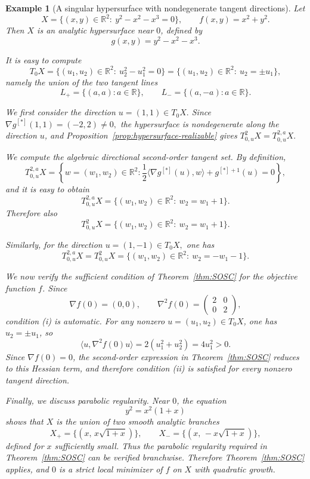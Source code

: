 \documentclass[10pt,reqno]{amsart}
\theoremstyle{break-italic}
\theoremstyle{break-italic}
\theoremstyle{break-italic}
\theoremstyle{break-italic}
\theoremstyle{break-italic}
\theoremstyle{break-italic}
\theoremstyle{break-italic}
\theoremstyle{break-italic}
\theoremstyle{break-roman}
\newtheorem{example}[satz]{Example}
\theoremstyle{standard}
\theoremstyle{varthm-roman}
\theoremstyle{varthm-italic}
\theoremstyle{varthm-roman-break}
\theoremstyle{varthm-italic-break}
\theoremstyle{varthm-roman-no-punctuation}
\theoremstyle{varthm-italic-no-punctuation}
\numberwithin{equation}{section}
\begin{document}
\begin{example}[A singular hypersurface with nondegenerate tangent directions]
\label{ex:opt-hypersurface}
Let
\[
X=\{(x,y)\in\mathbb R^2:\ y^2-x^2-x^3=0\},
\qquad
f(x,y)=x^2+y^2.
\]
Then $X$ is an analytic hypersurface near $0$, defined by
\[
g(x,y)=y^2-x^2-x^3.
\]

It is easy to compute 
\[
T_0X=\{(u_1,u_2)\in\mathbb R^2:\ u_2^2-u_1^2=0\}
=\{(u_1,u_2)\in\mathbb R^2:\ u_2=\pm u_1\},
\]
namely the union of the two tangent lines
\[
L_+=\{(a,a):a\in\mathbb R\},
\qquad
L_-=\{(a,-a):a\in\mathbb R\}.
\]

We first consider the direction
\(
u=(1,1)\in T_0X.
\)
Since 
\(
\nabla g^{[\ast]}(1,1)=(-2,2)\neq 0,
\)
the hypersurface is nondegenerate along the direction $u$, and
Proposition~\ref{prop:hypersurface-realizable} gives
\(
T^2_{0,u}X=T^{2,a}_{0,u}X.
\)

We compute the algebraic directional second-order tangent set. By definition,
\[
T^{2,a}_{0,u}X
=
\left\{
w=(w_1,w_2)\in\mathbb R^2:
\frac12\langle \nabla g^{[\ast]}(u),w\rangle + g^{[\ast]+1}(u)=0
\right\},
\]
and it is easy to obtain
\[
T^{2,a}_{0,u}X
=
\{(w_1,w_2)\in\mathbb R^2:\ w_2=w_1+1\}.
\]
Therefore also
\[
T^2_{0,u}X
=
\{(w_1,w_2)\in\mathbb R^2:\ w_2=w_1+1\}.
\]

Similarly, for the direction
\(
u=(1,-1)\in T_0X,
\)
one has
\[
T^{2,a}_{0,u}X=T^2_{0,u}X
=
\{(w_1,w_2)\in\mathbb R^2:\ w_2=-w_1-1\}.
\]

We now verify the sufficient condition of Theorem~\ref{thm:SOSC} for the
objective function $f$. Since
\[
\nabla f(0)=(0,0),
\qquad
\nabla^2 f(0)=
\begin{pmatrix}
2&0\\
0&2
\end{pmatrix},
\]
condition {\rm(i)} is automatic. For any nonzero
$u=(u_1,u_2)\in T_0X$, one has $u_2=\pm u_1$, so
\[
\langle u,\nabla^2 f(0)u\rangle
=
2(u_1^2+u_2^2)
=
4u_1^2>0.
\]
Since $\nabla f(0)=0$, the second-order expression in
Theorem~\ref{thm:SOSC} reduces to this Hessian term, and therefore
condition {\rm(ii)} is satisfied for every nonzero tangent direction.

Finally, we discuss parabolic regularity. Near $0$, the equation
\[
y^2=x^2(1+x)
\]
shows that $X$ is the union of two smooth analytic branches
\[
X_+=\{(x,\,x\sqrt{1+x})\},
\qquad
X_-=\{(x,\,-x\sqrt{1+x})\},
\]
defined for $x$ sufficiently small. Thus the parabolic regularity required in
Theorem~\ref{thm:SOSC} can be verified branchwise. Therefore
Theorem~\ref{thm:SOSC} applies, and $0$ is a strict local minimizer of $f$ on
$X$ with quadratic growth.
\end{example}
\end{document}
